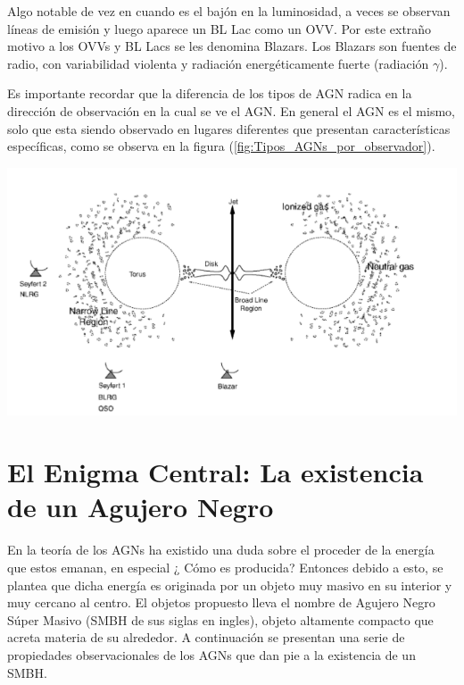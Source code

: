 Algo notable de vez en cuando es el bajón en la luminosidad, a veces se observan líneas de emisión y luego aparece un BL Lac como un OVV. Por este extraño motivo a los OVVs y BL Lacs se les denomina Blazars. Los Blazars son fuentes de radio, con variabilidad violenta y radiación energéticamente fuerte (radiación $\gamma$).


Es importante recordar que la diferencia de los tipos de AGN radica en la dirección de observación en la cual se ve el AGN. En general el AGN es el mismo, solo que esta siendo observado en lugares diferentes que presentan características específicas, como se observa en la figura (\ref{fig:Tipos_AGNs_por_observador}). 

\includegraphics[scale=.5]{./figures/3_AGNs/Clasificacion_AGN}
\label{fig:Tipos_AGNs_por_observador}



\section{El Enigma Central: La existencia de un Agujero Negro}
\label{sec:Zoo_AGN's}

En la teoría de los AGNs ha existido una duda sobre el proceder de la energía que estos emanan, en especial ¿ Cómo es producida? Entonces debido a esto, se plantea que dicha energía es originada por un objeto muy masivo en su interior y muy cercano al centro. El objetos propuesto lleva el nombre de Agujero Negro Súper Masivo (SMBH de sus siglas en ingles), objeto altamente compacto que acreta materia de su alrededor. A continuación se presentan una serie de propiedades observacionales de los AGNs que dan pie a la existencia de un SMBH. \\

